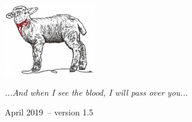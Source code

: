 \documentclass[10pt,oneside,footinclude=true,headinclude=true]{scrbook} %
\begin{document}
\begin{titlepage}
\begin{center}
\large \hfill \vfill

\begingroup
\color{NavyBlue} \\
\bigskip
\color{NavyBlue} \\ %
\bigskip
\endgroup

\bigskip\bigskip
\bigskip\bigskip
\bigskip\bigskip
\bigskip
\includegraphics[width=4cm]{lamb3nooval} \\
\bigskip
\bigskip\bigskip
\bigskip\bigskip
\bigskip\bigskip

\textit{...And when I see the blood, I will pass over you...} \\ \medskip %

April 2019\ -- version 1.5 %

\vfill
\end{center}
\end{titlepage}
    

\end{document}
